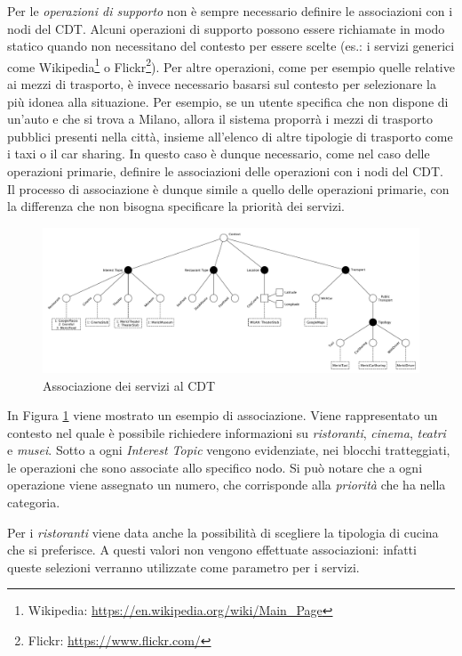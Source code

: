 Per le \emph{operazioni di supporto} non è sempre necessario definire le associazioni con i nodi del CDT. Alcuni operazioni di supporto possono essere richiamate in modo statico quando non necessitano del contesto per essere scelte (es.: i servizi generici come Wikipedia\footnote{Wikipedia: \url{https://en.wikipedia.org/wiki/Main_Page}} o Flickr\footnote{Flickr: \url{https://www.flickr.com/}}). Per altre operazioni, come per esempio quelle relative ai mezzi di trasporto, è invece necessario basarsi sul contesto per selezionare la più idonea alla situazione. Per esempio, se un utente specifica che non dispone di un'auto e che si trova a Milano, allora il sistema proporrà i mezzi di trasporto pubblici presenti nella città, insieme all'elenco di altre tipologie di trasporto come i taxi o il car sharing. In questo caso è dunque necessario, come nel caso delle operazioni primarie, definire le associazioni delle operazioni con i nodi del CDT. Il processo di associazione è dunque simile a quello delle operazioni primarie, con la differenza che non bisogna specificare la priorità dei servizi.

\begin{figure}[ht]
	\centering
	\includegraphics[width=\textwidth]{4-metodologia/Immagini/associazioni-cdt.pdf}
	\caption{Associazione dei servizi al CDT}\label{fig:associazione-servizi-cdt}
\end{figure}

In Figura \ref{fig:associazione-servizi-cdt} viene mostrato un esempio di associazione. Viene rappresentato un contesto nel quale è possibile richiedere informazioni su \emph{ristoranti}, \emph{cinema}, \emph{teatri} e \emph{musei}. Sotto a ogni \emph{Interest Topic} vengono evidenziate, nei blocchi tratteggiati, le operazioni che sono associate allo specifico nodo. Si può notare che a ogni operazione viene assegnato un numero, che corrisponde alla \emph{priorità} che ha nella categoria.

Per i \emph{ristoranti} viene data anche la possibilità di scegliere la tipologia di cucina che si preferisce. A questi valori non vengono effettuate associazioni: infatti queste selezioni verranno utilizzate come parametro per i servizi.

